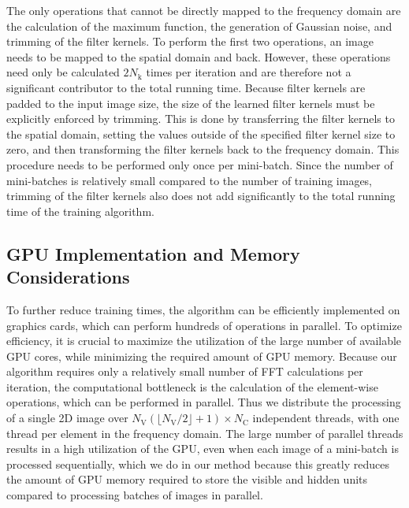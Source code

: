 The only operations that cannot be directly mapped to the frequency domain are
the calculation of the maximum function, the generation of Gaussian noise, and
trimming of the filter kernels. To perform the first two operations, an image
needs to be mapped to the spatial domain and back. However, these operations
need only be calculated $2N_\text{k}$ times per iteration and are therefore not
a significant contributor to the total running time. Because filter kernels are
padded to the input image size, the size of the learned filter kernels must be
explicitly enforced by trimming. This is done by transferring the filter kernels
to the spatial domain, setting the values outside of the specified filter kernel size
to zero, and then transforming the filter kernels back to the frequency domain.
This procedure needs to be performed only once per mini-batch. Since the number
of mini-batches is relatively small compared to the number of training images,
trimming of the filter kernels also does not add significantly to the total
running time of the training algorithm.

\subsection{GPU Implementation and Memory Considerations}

To further reduce training times, the algorithm can be efficiently implemented
on graphics cards, which can perform hundreds of operations in parallel.
To optimize efficiency, it is crucial to maximize the utilization of the large
number of available GPU cores, while minimizing the required amount of GPU
memory. Because our algorithm requires only a relatively small number of FFT
calculations per iteration, the computational bottleneck is the calculation of
the element-wise operations, which can be performed in parallel. Thus we
distribute the processing of a single 2D image over $N_\text{V}(\lfloor
N_\text{V}/2 \rfloor + 1) \times N_\text{C}$ independent threads, with one
thread per element in the frequency domain. The large number of parallel threads
results in a high utilization of the GPU, even when each image of a mini-batch
is processed sequentially, which we do in our method because this greatly
reduces the amount of GPU memory required to store the visible and hidden units
compared to processing batches of images in parallel.

